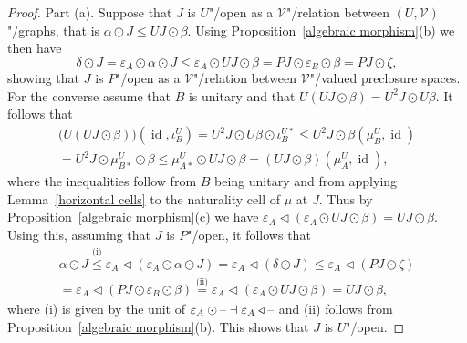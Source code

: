 \documentclass[preprint, a4paper]{elsarticle}
\theoremstyle{definition}
\theoremstyle{remark}
\providecommand{\lemref}[1]{Lemma~\ref{#1}}
\providecommand{\propref}[1]{Proposition~\ref{#1}}
\providecommand{\eps}{\varepsilon}
\newcommand{\dash}{\textup{--}}
\providecommand{\bigpars}[1]{\bigl(#1\bigr)}
\DeclareMathOperator{\id}{id}
\providecommand{\ladj}{\dashv}
\providecommand{\catvar}[1]{\mathcal{#1}}
\providecommand{\2}{\mathsf 2}
\providecommand{\V}{\catvar V}
\providecommand{\hc}{\odot}
\providecommand{\lhom}{\triangleleft}
\begin{document}
	\begin{proof}
		Part (a). Suppose that $J$ is $U$"/open as a $\V$"/relation between $(U, \V)$"/graphs, that is $\alpha \hc J \leq UJ \hc \beta$. Using \propref{algebraic morphism}(b) we then have
		\begin{displaymath}
			\delta \hc J = \eps_A \hc \alpha \hc J \leq \eps_A \hc UJ \hc \beta = PJ \hc \eps_B \hc \beta = PJ \hc \zeta,
		\end{displaymath}
		showing that $J$ is $P$"/open as a $\V$"/relation between $\V$"/valued preclosure spaces. For the converse assume that $B$ is unitary and that $U(UJ \hc \beta) = U^2J \hc U\beta$. It follows that
		\begin{multline*}
			\bigpars{U(UJ \hc \beta)}(\id, \iota^U_B) = U^2J \hc U\beta \hc \iota^{U*}_B \leq U^2J \hc \beta(\mu^U_B, \id) \\
			= U^2J \hc \mu^U_{B*} \hc \beta \leq \mu^U_{A*} \hc UJ \hc \beta = (UJ \hc \beta)(\mu^U_A, \id),
		\end{multline*}
		where the inequalities follow from $B$ being unitary and from applying \lemref{horizontal cells} to the naturality cell of $\mu$ at $J$. Thus by \propref{algebraic morphism}(c) we have $\eps_A \lhom (\eps_A \hc UJ \hc \beta) = UJ \hc \beta$. Using this, assuming that $J$ is $P$"/open, it follows that
		\begin{multline*}
			\alpha \hc J \overset{\text{(i)}}\leq \eps_A \lhom (\eps_A \hc \alpha \hc J) = \eps_A \lhom (\delta \hc J) \leq \eps_A \lhom (PJ \hc \zeta) \\
			= \eps_A \lhom (PJ \hc \eps_B \hc \beta) \overset{\text{(ii)}}= \eps_A \lhom (\eps_A \hc UJ \hc \beta) = UJ \hc \beta,
		\end{multline*}
		where (i) is given by the unit of $\eps_A \hc \dash \ladj \eps_A \lhom \dash$ and (ii) follows from \propref{algebraic morphism}(b). This shows that $J$ is $U$"/open.
		

\end{proof}
\end{document}
